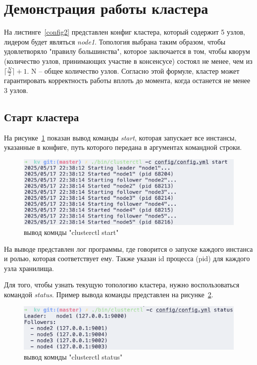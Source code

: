 \section{Демонстрация работы кластера}

На листинге~\ref{config2} представлен конфиг кластера, который содержит 5 узлов, лидером будет являться \textit{node1}. Топология выбрана таким образом,
чтобы удовлетворяло "правилу большинства", которое заключается в том, чтобы кворум (количество узлов, принимающих участие в консенсусе) состоял не менее,
чем из $\lceil \frac{N}{2} \rceil + 1$. N -- общее количество узлов. Согласно этой формуле, кластер может гарантировать корректность работы
вплоть до момента, когда останется не менее 3 узлов.


\subsection{Старт кластера}

На рисунке~\ref{fig:fig4} показан вывод команды \textit{start}, которая запускает все инстансы, указанные в конфиге, путь которого передана в аргументах
командной строки.

\begin{figure}
  \centering
  \includegraphics[scale=0.6]{assets/start.png}
  \caption{вывод комнды "clusterctl start"}
  \label{fig:fig4}
\end{figure}

На выводе представлен лог программы, где говорится о запуске каждого инстанса и ролью, которая соответствует ему. Также указан id процесса (pid) для
каждого узла хранилища.

Для того, чтобы узнать текущую топологию кластера, нужно воспользоваться командой \textit{status}. Пример вывода команды представлен на рисунке~\ref{fig:fig5}.

\begin{figure}
  \centering
  \includegraphics[scale=0.6]{assets/status.png}
  \caption{вывод комнды "clusterctl status"}
  \label{fig:fig5}
\end{figure}


